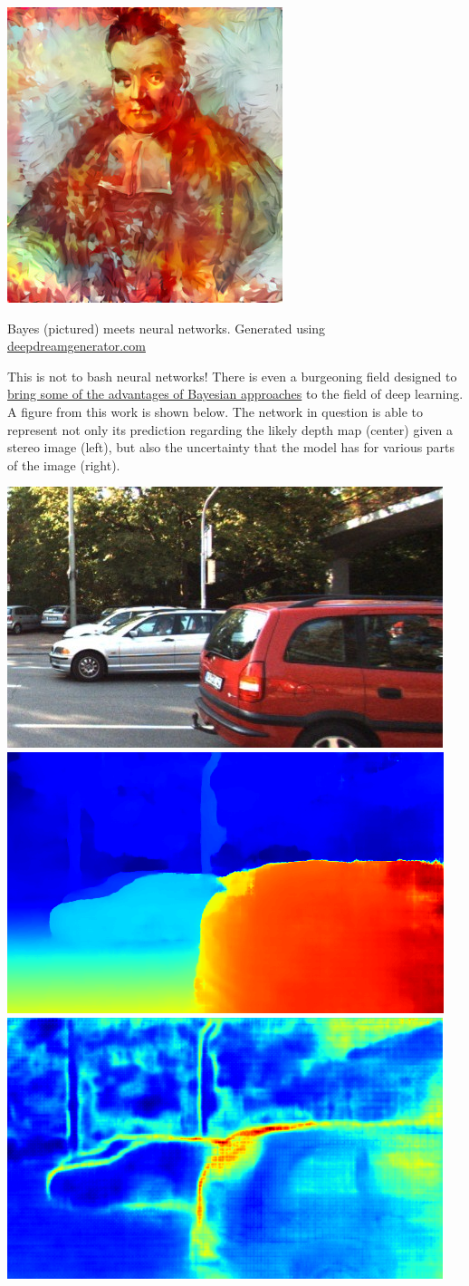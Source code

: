 \documentclass[assignment01_Solutions]{subfiles}
\begin{document}
 \begin{marginfigure}
 \includegraphics[width=\linewidth]{figures/bayesdeepdream}
 \caption{Bayes (pictured) meets neural networks.  Generated using \href{https://deepdreamgenerator.com}{deepdreamgenerator.com}}
 \end{marginfigure}
 This is not to bash neural networks!  There is even a burgeoning field designed to \href{https://alexgkendall.com/computer_vision/bayesian_deep_learning_for_safe_ai/}{bring some of the advantages of Bayesian approaches} to the field of deep learning.  A figure from this work is shown below.  The network in question is able to represent not only its prediction regarding the likely depth map (center) given a stereo image (left), but also the uncertainty that the model has for various parts of the image (right).
 
 \begin{center}
  \includegraphics[width=0.3\linewidth]{figures/left_stereo}
    \includegraphics[width=0.3\linewidth]{figures/disparity}
 \includegraphics[width=0.3\linewidth]{figures/depthuncertainty}
 \end{center}
\end{document}
